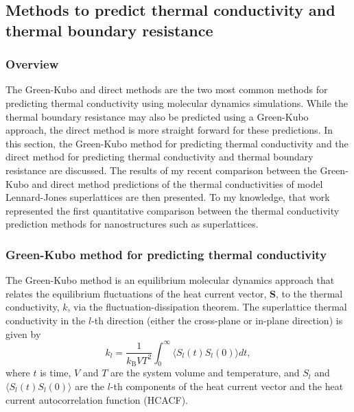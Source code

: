 \documentclass[letterpaper,12pt]{article}
\begin{document}
\subsection{\label{S-MD-k}Methods to predict thermal conductivity and thermal boundary resistance}

\subsubsection*{\label{S-MD-overview}Overview}

The Green-Kubo and direct methods are the two most common methods
for predicting thermal conductivity using molecular dynamics
simulations. While the thermal boundary resistance may also be
predicted using a Green-Kubo approach,\cite{mcgaughey2006b} the
direct method is more straight forward for these predictions. In
this section, the Green-Kubo method for predicting thermal
conductivity and the direct method for predicting thermal
conductivity and thermal boundary resistance are discussed. The
results of my recent comparison\cite{landry2008a} between the
Green-Kubo and direct method predictions of the thermal
conductivities of model Lennard-Jones superlattices are then
presented. To my knowledge, that work represented the first
quantitative comparison between the thermal conductivity prediction
methods for nanostructures such as superlattices.

\subsubsection*{\label{S-MD-GK}Green-Kubo method for predicting thermal conductivity}

The Green-Kubo method is an equilibrium molecular dynamics approach
that relates the equilibrium fluctuations of the heat current
vector, \textbf{S}, to the thermal conductivity, $k$, via the
fluctuation-dissipation theorem. The superlattice thermal
conductivity in the $l$-th direction (either the cross-plane or
in-plane direction) is given by \cite{mcquarrie}
\begin{equation}
k_l=\frac{1}{k_{\mathrm{B}}VT^2}\int_0^{\infty}\langle S_l(t)S_l(0)
\rangle dt, \label{E-GK}
\end{equation}
where $t$ is time, $V$ and $T$ are the system volume and
temperature, and $S_l$ and $\langle S_l(t)S_l(0) \rangle$ are the
$l$-th components of the heat current vector and the heat current
autocorrelation function (HCACF).
\end{document}
